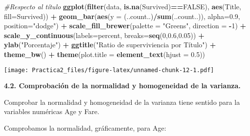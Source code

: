 \documentclass[]{article}
\newenvironment{Shaded}{\begin{snugshade}}{\end{snugshade}}
\newcommand{\KeywordTok}[1]{\textcolor[rgb]{0.13,0.29,0.53}{\textbf{#1}}}
\newcommand{\DataTypeTok}[1]{\textcolor[rgb]{0.13,0.29,0.53}{#1}}
\newcommand{\DecValTok}[1]{\textcolor[rgb]{0.00,0.00,0.81}{#1}}
\newcommand{\FloatTok}[1]{\textcolor[rgb]{0.00,0.00,0.81}{#1}}
\newcommand{\StringTok}[1]{\textcolor[rgb]{0.31,0.60,0.02}{#1}}
\newcommand{\CommentTok}[1]{\textcolor[rgb]{0.56,0.35,0.01}{\textit{#1}}}
\newcommand{\OtherTok}[1]{\textcolor[rgb]{0.56,0.35,0.01}{#1}}
\newcommand{\OperatorTok}[1]{\textcolor[rgb]{0.81,0.36,0.00}{\textbf{#1}}}
\newcommand{\NormalTok}[1]{#1}
\begin{document}
\begin{Shaded}
\begin{Highlighting}[]
\CommentTok{#Respecto al título}
\KeywordTok{ggplot}\NormalTok{(}\KeywordTok{filter}\NormalTok{(data, }\KeywordTok{is.na}\NormalTok{(Survived)}\OperatorTok{==}\OtherTok{FALSE}\NormalTok{), }\KeywordTok{aes}\NormalTok{(Title, }\DataTypeTok{fill=}\NormalTok{Survived)) }\OperatorTok{+}\StringTok{ }
\StringTok{  }\KeywordTok{geom_bar}\NormalTok{(}\KeywordTok{aes}\NormalTok{(}\DataTypeTok{y =}\NormalTok{ (..count..)}\OperatorTok{/}\KeywordTok{sum}\NormalTok{(..count..)), }\DataTypeTok{alpha=}\FloatTok{0.9}\NormalTok{, }\DataTypeTok{position=}\StringTok{"dodge"}\NormalTok{) }\OperatorTok{+}
\StringTok{  }\KeywordTok{scale_fill_brewer}\NormalTok{(}\DataTypeTok{palette =} \StringTok{"Greens"}\NormalTok{, }\DataTypeTok{direction =} \OperatorTok{-}\DecValTok{1}\NormalTok{) }\OperatorTok{+}
\StringTok{  }\KeywordTok{scale_y_continuous}\NormalTok{(}\DataTypeTok{labels=}\NormalTok{percent, }\DataTypeTok{breaks=}\KeywordTok{seq}\NormalTok{(}\DecValTok{0}\NormalTok{,}\FloatTok{0.6}\NormalTok{,}\FloatTok{0.05}\NormalTok{)) }\OperatorTok{+}
\StringTok{  }\KeywordTok{ylab}\NormalTok{(}\StringTok{"Porcentaje"}\NormalTok{) }\OperatorTok{+}\StringTok{ }
\StringTok{  }\KeywordTok{ggtitle}\NormalTok{(}\StringTok{"Ratio de superviviencia por Título"}\NormalTok{) }\OperatorTok{+}
\StringTok{  }\KeywordTok{theme_bw}\NormalTok{() }\OperatorTok{+}
\StringTok{  }\KeywordTok{theme}\NormalTok{(}\DataTypeTok{plot.title =} \KeywordTok{element_text}\NormalTok{(}\DataTypeTok{hjust =} \FloatTok{0.5}\NormalTok{))}
\end{Highlighting}
\end{Shaded}

\texttt{[image: Practica2\_files/figure-latex/unnamed-chunk-12-1.pdf]}

\textbf{4.2. Comprobación de la normalidad y homogeneidad de la
varianza.}

Comprobar la normalidad y homogeneidad de la varianza tiene sentido para
la variables numéricas Age y Fare.

Comprobamos la normalidad, gráficamente, para Age:

\begin{Shaded}
\end{Shaded}
\end{document}
